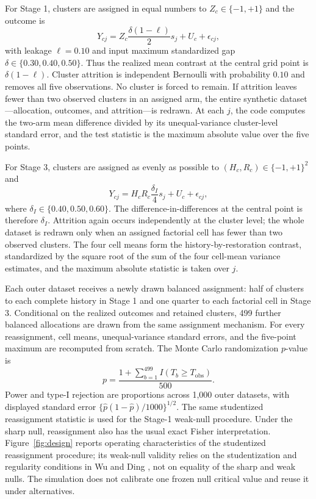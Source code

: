 \documentclass[pdflatex,sn-mathphys-num]{sn-jnl}
\begin{document}
\begin{appendices}
For Stage 1, clusters are assigned in equal numbers to $Z_c\in\{-1,+1\}$ and the outcome is
\begin{equation}
Y_{cj}=Z_c\frac{\delta(1-\ell)}{2}s_j+U_c+\epsilon_{cj},
\label{eq:power-history-dgp}
\end{equation}
with leakage $\ell=0.10$ and input maximum standardized gap $\delta\in\{0.30,0.40,0.50\}$. Thus the realized mean contrast at the central grid point is $\delta(1-\ell)$. Cluster attrition is independent Bernoulli with probability $0.10$ and removes all five observations. No cluster is forced to remain. If attrition leaves fewer than two observed clusters in an assigned arm, the entire synthetic dataset---allocation, outcomes, and attrition---is redrawn. At each $j$, the code computes the two-arm mean difference divided by its unequal-variance cluster-level standard error, and the test statistic is the maximum absolute value over the five points.

For Stage 3, clusters are assigned as evenly as possible to $(H_c,R_c)\in\{-1,+1\}^2$ and
\begin{equation}
Y_{cj}=H_cR_c\frac{\delta_I}{4}s_j+U_c+\epsilon_{cj},
\label{eq:power-reset-dgp}
\end{equation}
where $\delta_I\in\{0.40,0.50,0.60\}$. The difference-in-differences at the central point is therefore $\delta_I$. Attrition again occurs independently at the cluster level; the whole dataset is redrawn only when an assigned factorial cell has fewer than two observed clusters. The four cell means form the history-by-restoration contrast, standardized by the square root of the sum of the four cell-mean variance estimates, and the maximum absolute statistic is taken over $j$.

Each outer dataset receives a newly drawn balanced assignment: half of clusters to each complete history in Stage 1 and one quarter to each factorial cell in Stage 3. Conditional on the realized outcomes and retained clusters, 499 further balanced allocations are drawn from the same assignment mechanism. For every reassignment, cell means, unequal-variance standard errors, and the five-point maximum are recomputed from scratch. The Monte Carlo randomization $p$-value is
\begin{equation}
p=\frac{1+\sum_{b=1}^{499}I(T_b\geq T_{\mathrm{obs}})}{500}.
\end{equation}
Power and type-I rejection are proportions across 1,000 outer datasets, with displayed standard error $\{\widehat p(1-\widehat p)/1000\}^{1/2}$. The same studentized reassignment statistic is used for the Stage-1 weak-null procedure. Under the sharp null, reassignment also has the usual exact Fisher interpretation. Figure~\ref{fig:design} reports operating characteristics of the studentized reassignment procedure; its weak-null validity relies on the studentization and regularity conditions in Wu and Ding \cite{wu2021randomization}, not on equality of the sharp and weak nulls. The simulation does not calibrate one frozen null critical value and reuse it under alternatives.


\end{appendices}
\end{document}

